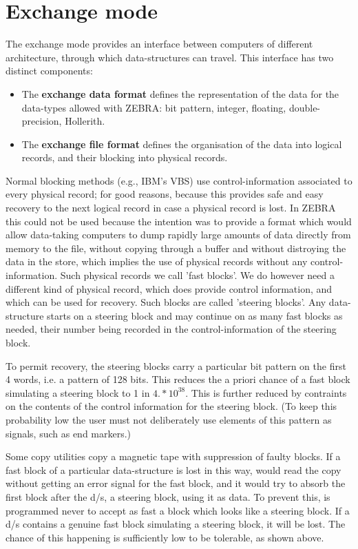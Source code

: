 \section{Exchange mode}

The exchange mode provides an interface between computers of
different architecture, through which data-structures can travel.
This interface has two distinct components:

\begin{itemize}
 \item The {\bf exchange data format} defines the representation
       of the data for the data-types allowed with ZEBRA:
       bit pattern, integer, floating, double-precision, Hollerith.
 \item The {\bf exchange file format} defines the organisation of
       the data into logical records,
       and their blocking into physical records.
\end{itemize}

Normal blocking methods (e.g., IBM's VBS)
use control-information associated to every phy\-si\-cal record;
for good reasons, because this provides safe and easy recovery to the
next logical record in case a physical record is lost.
In ZEBRA this could not be used because the intention was to provide
a format which would allow data-taking computers to dump rapidly
large amounts of data directly from memory to the file,
without copying through a buffer and without distroying the data
in the store,
which implies the use of physical records without
any control-information.
Such physical records we call 'fast blocks'.
We do however need a different kind of physical record,
which does provide control information,
and which can be used for recovery.
Such blocks are called 'steering blocks'.
Any data-structure starts on a steering block and may continue on as
many fast blocks as needed,
their number being recorded in the control-information of the
steering block.

To permit recovery, the steering blocks carry a particular bit
pattern on the first 4 words,
i.e. a pattern of 128 bits.
This reduces the a priori chance of a fast block
simulating a steering block to 1 in \(4.*10^{38}\).
This is further reduced by contraints on the contents of the control
information for the steering block.
(To keep this probability low the user must not deliberately
use elements of this pattern as signals,
such as end markers.)

Some copy utilities copy a magnetic tape with suppression of faulty
blocks.
If a fast block of a particular data-structure is lost in this way,
 would read the copy without getting an error signal
for the fast block,
and it would try to absorb the first block after the d/s,
a steering block, using it as data.
To prevent this,  is programmed never to accept as fast
a block which looks like a steering block.
If a d/s contains a genuine fast block simulating a steering block,
it will be lost.
The chance of this happening is sufficiently low to be tolerable,
as shown above.

